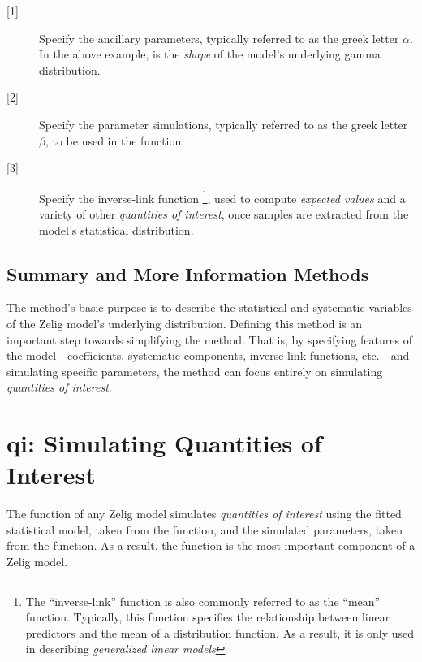 \begin{description}

	\item[{[1]}] Specify the ancillary parameters, typically referred to as the greek letter $\alpha$. In the above example,  is the \emph{shape} of the model's underlying gamma distribution.
	
	\item[{[2]}] Specify the parameter simulations, typically referred to as the greek letter $\beta$, to be used in the  function.
	
	\item[{[3]}] Specify the inverse-link function
		\footnote{The ``inverse-link'' function is also commonly referred to as the ``mean'' function. Typically, this function specifies the relationship between linear predictors and the mean of a distribution function. As a result, it is only used in describing \emph{generalized linear models} },
		used to compute \emph{expected values} and a variety of other \emph{quantities of interest}, once samples are extracted from the model's statistical distribution.

\end{description}


\subsection{Summary and More Information  Methods}

The  method's basic purpose is to describe the statistical and systematic variables of the Zelig model's underlying distribution. Defining this method is an important step towards simplifying the  method. That is, by specifying features of the model - coefficients, systematic components, inverse link functions, etc. - and simulating specific parameters, the  method can focus entirely on simulating \emph{quantities of interest}.
	



\section{qi: Simulating Quantities of Interest}\label{section:qi}

The  function of any Zelig model simulates \emph{quantities of interest}
using the fitted statistical model, taken from the  function,
and the simulated parameters, taken from the  function. As a result,
the  function is the most important component of a Zelig model.

